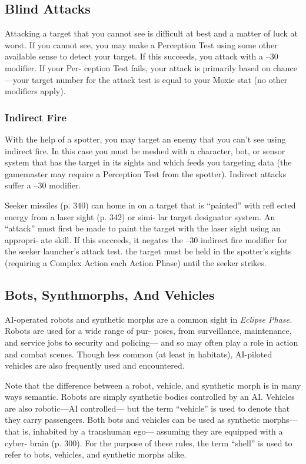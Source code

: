 \subsection{Blind Attacks}

Attacking a target that you cannot see is 
difficult at best and a matter of luck at 
worst. If you cannot see, you may make a 
Perception Test using some other available 
sense to detect your target. If this succeeds, 
you attack with a –30 modifier. If your Per-
ception Test fails, your attack is primarily 
based on chance—your target number for 
the attack test is equal to your Moxie stat 
(no other modifiers apply).

\subsubsection{Indirect Fire}

With the help of a spotter, you may target 
an enemy that you can't see using indirect 
fire. In this case you must be meshed with 
a character, bot, or sensor system that has 
the target in its sights and which feeds 
you targeting data (the gamemaster may 
require a Perception Test from the spotter). 
Indirect attacks suffer a –30 modifier.

Seeker missiles (p. 340) can home in on 
a target that is ``painted'' with refl ected 
energy from a laser sight (p. 342) or simi-
lar target designator system. An ``attack'' 
must first be made to paint the target 
with the laser sight using an appropri-
ate skill. If this succeeds, it negates the 
–30 indirect fire  modifier for the seeker 
launcher's attack test. the target must be 
held in the spotter's sights (requiring a 
Complex Action each Action Phase) until 
the seeker strikes.

\subsection{Bots, Synthmorphs, And Vehicles}

AI-operated robots and synthetic morphs 
are a common sight in \textit{Eclipse Phase.}
Robots are used for a wide range of pur-
poses, from surveillance, maintenance, 
and service jobs to security and policing—
and so may often play a role in action and 
combat scenes. Though less common (at 
least in habitats), AI-piloted vehicles are 
also frequently used and encountered.

Note that the difference between a 
robot, vehicle, and synthetic morph is in 
many ways semantic. Robots are simply 
synthetic bodies controlled by an AI. 
Vehicles are also robotic—AI controlled—
but the term ``vehicle'' is used to denote 
that they carry passengers. Both bots and 
vehicles can be used as synthetic morphs—
that is, inhabited by a transhuman ego—
assuming they are equipped with a cyber-
brain (p. 300). For the purpose of these 
rules, the term ``shell'' is used to refer to 
bots, vehicles, and synthetic morphs alike.

